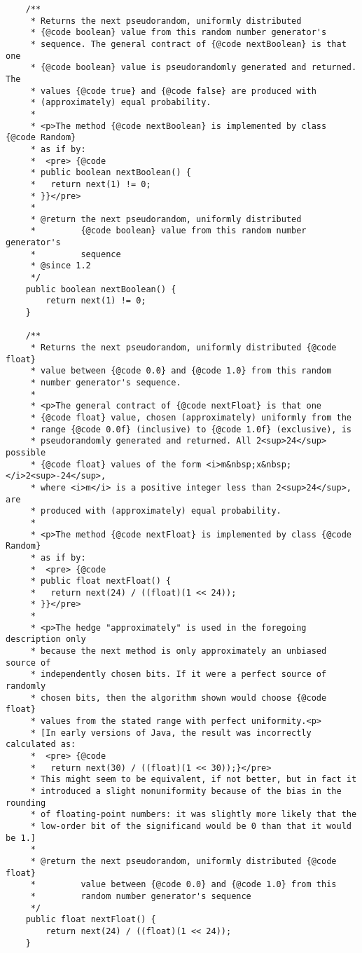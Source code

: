 \documentclass[12pt,a4paper,twoside,openright,titlepage,final]{article}
\begin{document}
\begin{verbatim}
    /**
     * Returns the next pseudorandom, uniformly distributed
     * {@code boolean} value from this random number generator's
     * sequence. The general contract of {@code nextBoolean} is that one
     * {@code boolean} value is pseudorandomly generated and returned.  The
     * values {@code true} and {@code false} are produced with
     * (approximately) equal probability.
     *
     * <p>The method {@code nextBoolean} is implemented by class {@code Random}
     * as if by:
     *  <pre> {@code
     * public boolean nextBoolean() {
     *   return next(1) != 0;
     * }}</pre>
     *
     * @return the next pseudorandom, uniformly distributed
     *         {@code boolean} value from this random number generator's
     *         sequence
     * @since 1.2
     */
    public boolean nextBoolean() {
        return next(1) != 0;
    }

    /**
     * Returns the next pseudorandom, uniformly distributed {@code float}
     * value between {@code 0.0} and {@code 1.0} from this random
     * number generator's sequence.
     *
     * <p>The general contract of {@code nextFloat} is that one
     * {@code float} value, chosen (approximately) uniformly from the
     * range {@code 0.0f} (inclusive) to {@code 1.0f} (exclusive), is
     * pseudorandomly generated and returned. All 2<sup>24</sup> possible
     * {@code float} values of the form <i>m&nbsp;x&nbsp;</i>2<sup>-24</sup>,
     * where <i>m</i> is a positive integer less than 2<sup>24</sup>, are
     * produced with (approximately) equal probability.
     *
     * <p>The method {@code nextFloat} is implemented by class {@code Random}
     * as if by:
     *  <pre> {@code
     * public float nextFloat() {
     *   return next(24) / ((float)(1 << 24));
     * }}</pre>
     *
     * <p>The hedge "approximately" is used in the foregoing description only
     * because the next method is only approximately an unbiased source of
     * independently chosen bits. If it were a perfect source of randomly
     * chosen bits, then the algorithm shown would choose {@code float}
     * values from the stated range with perfect uniformity.<p>
     * [In early versions of Java, the result was incorrectly calculated as:
     *  <pre> {@code
     *   return next(30) / ((float)(1 << 30));}</pre>
     * This might seem to be equivalent, if not better, but in fact it
     * introduced a slight nonuniformity because of the bias in the rounding
     * of floating-point numbers: it was slightly more likely that the
     * low-order bit of the significand would be 0 than that it would be 1.]
     *
     * @return the next pseudorandom, uniformly distributed {@code float}
     *         value between {@code 0.0} and {@code 1.0} from this
     *         random number generator's sequence
     */
    public float nextFloat() {
        return next(24) / ((float)(1 << 24));
    }


\end{verbatim}
\end{document}
